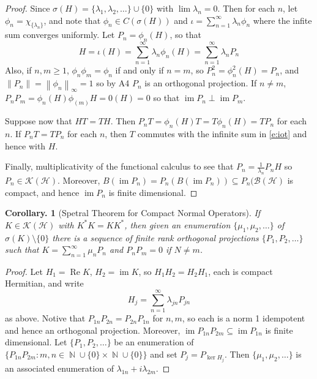 \documentclass[11pt, a4paper]{memoir}
\DeclareMathOperator{\N}{{\mathbb{N}}}
\newcommand{\norm}[1]{\ensuremath{\left\lVert#1\right\rVert}}
\theoremstyle{change}
\newtheorem{corollary}[theorem]{Corollary.}
\theoremstyle{plain}
\theoremstyle{nonumberplain}
\newtheorem{proof}{Proof}
\DeclareMathOperator{\im}{im}
\renewcommand{\Re}{\ensuremath{\operatorname{Re}}}
\numberwithin{equation}{section}
\begin{document}
\begin{proof}
    Since $\sigma(H)=\{\lambda_1,\lambda_2,\ldots\}\cup\{0\}$ with $\lim\lambda_n=0$.
    Then for each $n$, let $\phi_n=\chi_{\{\lambda_n\}}$, and note that $\phi_n\in C(\sigma(H))$ and $\iota=\sum_{n=1}^\infty\lambda_n\phi_n$ where the infite sum converges uniformly.
    Let $P_n=\phi_n(H)$, so that
    \begin{equation}\label{e:iot}
        H=\iota(H)=\sum_{n=1}^\infty\lambda_n\phi_n(H)=\sum_{n=1}^\infty \lambda_nP_n
    \end{equation}
    Also, if $n,m\geq 1$, $\phi_n\phi_m=\phi_n$ if and only if $n=m$, so $P_n^2=\phi_n^2(H)=P_n$, and $\norm{P_n}=\norm{\phi_n}_\infty=1$ so by A4 $P_n$ is an orthogonal projection.
    If $n\neq m$, $P_nP_m=\phi_n(H)\phi_(m)H=0(H)=0$ so that $\im P_n\perp\im P_m$.

    Suppose now that $HT=TH$.
    Then $P_nT=\phi_n(H)T=T\phi_n(H)=TP_n$ for each $n$.
    If $P_nT=TP_n$ for each $n$, then $T$ commutes with the infinite sum in \cref{e:iot} and hence with $H$.
    
    Finally, multiplicativity of the functional calculus to see that $P_n=\frac{1}{\lambda_n}P_nH$ so $P_n\in\mathcal{K}(\mathcal{H})$.
    Moreover, $B(\im P_n)=P_n(B(\im P_n))\subseteq P_n(\mathcal{B}(\mathcal{H})$ is compact, and hence $\im P_n$ is finite dimensional.
\end{proof}
\begin{corollary}[Spetral Theorem for Compact Normal Operators]
    If $K\in\mathcal{K}(\mathcal{H})$ with $K^*K=KK^*$, then given an enumeration $\{\mu_1,\mu_2,\ldots\}$ of $\sigma(K)\setminus\{0\}$ there is a sequence of finite rank orthogonal projections $\{P_1,P_2,\ldots\}$ such that $K=\sum_{n=1}^\infty\mu_n P_n$ and $P_nP_m=0$ if $N\neq m$.
\end{corollary}
\begin{proof}
    Let $H_1=\Re K$, $H_2=\im K$, so $H_1H_2=H_2H_1$, each is compact Hermitian, and write
    \begin{equation*}
        H_j=\sum_{n=1}^\infty\lambda_{jn}P_{jn}
    \end{equation*}
    as above.
    Notive that $P_{1n}P_{2n}=P_{2n}P_{1n}$ for $n,m$, so each is a norm 1 idempotent and hence an orthogonal projection.
    Moreover, $\im P_{1n}P_{2m}\subseteq\im P_{1n}$ is finite dimensional.
    Let $\{P_1,P_2,\ldots\}$ be an enumeration of $\{P_{1n}P_{2m}:m,n\in \N\cup\{0\}\times\N\cup\{0\}\}$ and set $P_{j}=P_{\ker H_j}$.
    Then $\{\mu_1,\mu_2,\ldots\}$ is an associated enumeration of $\lambda_{1n}+i\lambda_{2m}$.
\end{proof}
\end{document}
